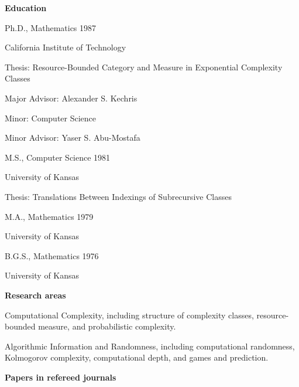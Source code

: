 {\bf Education}

\vspace*{\smallskipamount}
Ph.D., Mathematics 1987

California Institute of Technology

\hangindent=0.3in
Thesis:  Resource-Bounded Category and Measure in Exponential
Complexity Classes

Major Advisor:  Alexander S. Kechris

Minor:  Computer Science

Minor Advisor:  Yaser S. Abu-Mostafa

\vspace*{\medskipamount}
M.S., Computer Science 1981

University of Kansas

Thesis:  Translations Between Indexings of Subrecursive Classes

\vspace*{\medskipamount}
M.A., Mathematics 1979

University of Kansas

\vspace*{\medskipamount}
B.G.S., Mathematics 1976

University of Kansas

\vspace*{\bigskipamount}
{\bf Research areas}

\vspace*{\smallskipamount} Computational Complexity, including 
structure of complexity classes, resource-bounded measure, and
probabilistic complexity.

\vspace*{\smallskipamount} Algorithmic Information and Randomness, 
including computational randomness, Kolmogorov complexity, 
computational depth, and games and prediction.

\vspace*{\bigskipamount}
{\bf Papers in refereed journals}

